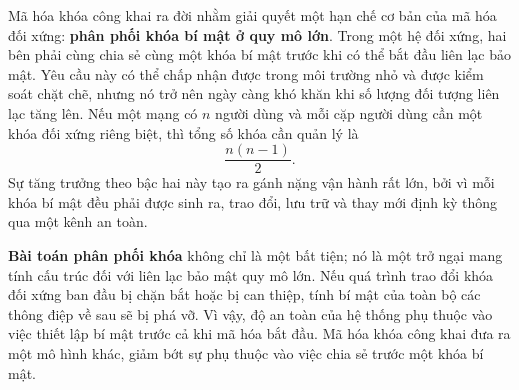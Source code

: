 Mã hóa khóa công khai ra đời nhằm giải quyết một hạn chế cơ bản của mã hóa đối xứng: \textbf{phân phối khóa bí mật ở quy mô lớn}. Trong một hệ đối xứng, hai bên phải cùng chia sẻ cùng một khóa bí mật trước khi có thể bắt đầu liên lạc bảo mật. Yêu cầu này có thể chấp nhận được trong môi trường nhỏ và được kiểm soát chặt chẽ, nhưng nó trở nên ngày càng khó khăn khi số lượng đối tượng liên lạc tăng lên. Nếu một mạng có $n$ người dùng và mỗi cặp người dùng cần một khóa đối xứng riêng biệt, thì tổng số khóa cần quản lý là
\[
\frac{n(n-1)}{2}.
\]
Sự tăng trưởng theo bậc hai này tạo ra gánh nặng vận hành rất lớn, bởi vì mỗi khóa bí mật đều phải được sinh ra, trao đổi, lưu trữ và thay mới định kỳ thông qua một kênh an toàn.

\textbf{Bài toán phân phối khóa} không chỉ là một bất tiện; nó là một trở ngại mang tính cấu trúc đối với liên lạc bảo mật quy mô lớn. Nếu quá trình trao đổi khóa đối xứng ban đầu bị chặn bắt hoặc bị can thiệp, tính bí mật của toàn bộ các thông điệp về sau sẽ bị phá vỡ. Vì vậy, độ an toàn của hệ thống phụ thuộc vào việc thiết lập bí mật trước cả khi mã hóa bắt đầu. Mã hóa khóa công khai đưa ra một mô hình khác, giảm bớt sự phụ thuộc vào việc chia sẻ trước một khóa bí mật.

